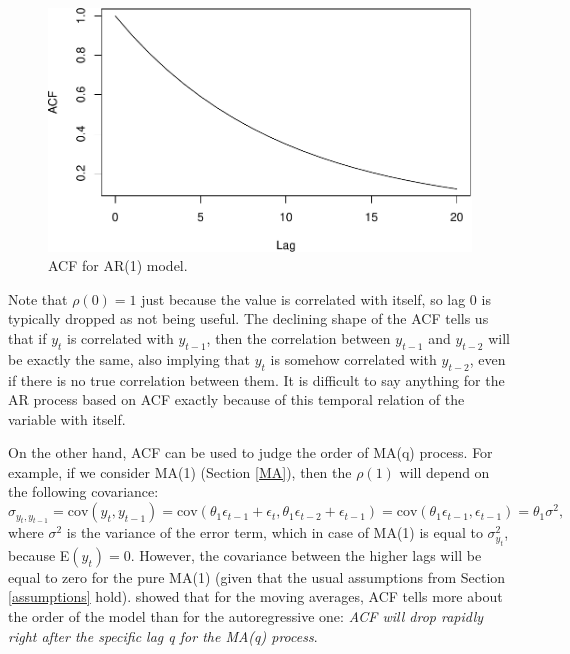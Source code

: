 \documentclass[]{book}
\theoremstyle{definition}
\theoremstyle{definition}
\theoremstyle{definition}
\theoremstyle{definition}
\theoremstyle{remark}
\begin{document}
\begin{figure}
\centering
\includegraphics{Svetunkov--2022----ADAM_files/figure-latex/ACFExampleAR1-1.pdf}
\caption{\label{fig:ACFExampleAR1}ACF for AR(1) model.}
\end{figure}

Note that \(\rho(0)=1\) just because the value is correlated with itself, so lag 0 is typically dropped as not being useful. The declining shape of the ACF tells us that if \(y_t\) is correlated with \(y_{t-1}\), then the correlation between \(y_{t-1}\) and \(y_{t-2}\) will be exactly the same, also implying that \(y_{t}\) is somehow correlated with \(y_{t-2}\), even if there is no true correlation between them. It is difficult to say anything for the AR process based on ACF exactly because of this temporal relation of the variable with itself.

On the other hand, ACF can be used to judge the order of MA(q) process. For example, if we consider MA(1) (Section \ref{MA}), then the \(\rho(1)\) will depend on the following covariance:
\begin{equation}
  \sigma_{y_t,y_{t-1}} = \mathrm{cov}(y_t,y_{t-1}) = \mathrm{cov}(\theta_1 \epsilon_{t-1} + \epsilon_t, \theta_1 \epsilon_{t-2} + \epsilon_{t-1}) = \mathrm{cov}(\theta_1 \epsilon_{t-1}, \epsilon_{t-1}) = \theta_1 \sigma^2 ,
  \label{eq:autoCovarianceMA1}
\end{equation}
where \(\sigma^2\) is the variance of the error term, which in case of MA(1) is equal to \(\sigma^2_{y_t}\), because E\((y_t)=0\). However, the covariance between the higher lags will be equal to zero for the pure MA(1) (given that the usual assumptions from Section \ref{assumptions} hold). \citet{Box1976} showed that for the moving averages, ACF tells more about the order of the model than for the autoregressive one: \emph{ACF will drop rapidly right after the specific lag q for the MA(q) process}.
\end{document}
